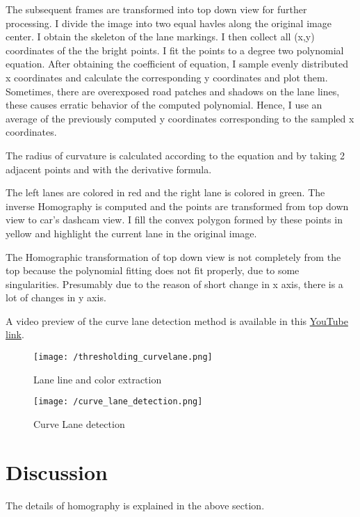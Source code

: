 \documentclass[a4paper, 10pt]{article}
\begin{document}
\begin{multicols}{2}
		The subsequent frames are transformed into top down view for further processing. I divide the image into two equal havles along the original image center. I obtain the skeleton of the lane markings. I then collect all (x,y) coordinates of the the bright points. I fit the points to a degree two polynomial equation. After obtaining the coefficient of equation, I sample evenly distributed x coordinates and calculate the corresponding y coordinates and plot them. Sometimes, there are overexposed road patches and shadows on the lane lines, these causes erratic behavior of the computed polynomial. Hence, I use an average of the previously computed y coordinates corresponding to the sampled x coordinates. 
		
		The radius of curvature is calculated according to the equation and by taking 2 adjacent points and with the derivative formula. 
		
		The left lanes are colored in red and the right lane is colored in green. The inverse Homography is computed and the points are transformed from top down view to car's dashcam view. I fill the convex polygon formed by these points in yellow and highlight the current lane in the original image. 
		
		The Homographic transformation of top down view is not completely from the top because the polynomial fitting does not fit properly, due to some singularities. Presumably due to the reason of short change in x axis, there is a lot of changes in y axis. 
		
		A video preview of the curve lane detection method is available in this \href{https://youtu.be/5v3jpyDuoz4}{YouTube link}.
		
		\begin{figure}[H]
			\centering
			\texttt{[image: /thresholding\_curvelane.png]}
			\caption{Lane line and color extraction}
			\label{fig:thresh}
		\end{figure}
		
		\begin{figure}[H]
			\centering
			\texttt{[image: /curve\_lane\_detection.png]}
			\caption{Curve Lane detection}
			\label{fig:curve}
		\end{figure}
		
		\section{Discussion}
		The details of homography is explained in the above section.
		

\end{multicols}
\end{document}
